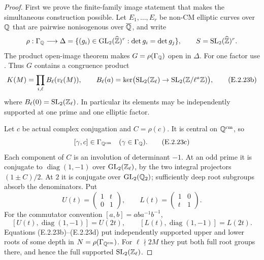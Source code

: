 \begin{proof}
First we prove the finite-family image statement that makes
the simultaneous construction possible. Let
\(E_1,\ldots,E_r\) be non-CM elliptic curves over \(\mathbb Q\)
that are pairwise nonisogenous over \(\overline{\mathbb Q}\), and write
\[
 \rho:\Gamma_{\mathbb Q}\longrightarrow
 \Delta=\{(g_i)\in\operatorname{GL}_2(\widehat{\mathbb Z})^r:
                  \det g_i=\det g_j\},\qquad
 S=\operatorname{SL}_2(\widehat{\mathbb Z})^r.
\]
The product open-image theorem
\cite[Theorem 1.1 and Remark 1.2, author PDF p.1]{GenLombardo}
makes \(G=\rho(\Gamma_{\mathbb Q})\) open in \(\Delta\).
For one factor use \cite[Theorem 3, p.299]{GenSerre1972}.
Thus \(G\) contains a congruence product
\[
 K(M)=\prod_{i,\ell}B_\ell(v_\ell(M)),\qquad
 B_\ell(a)=\ker\bigl(\operatorname{SL}_2(\mathbb Z_\ell)
                 \to\operatorname{SL}_2(\mathbb Z/\ell^a\mathbb Z)\bigr),
 \tag{E.2.23b}
\]
where \(B_\ell(0)=\operatorname{SL}_2(\mathbb Z_\ell)\).
In particular its elements may be independently supported
at one prime and one elliptic factor.

Let \(c\) be actual complex conjugation and \(C=\rho(c)\).
It is central on \(\mathbb Q^{\mathrm{cm}}\), so
\[
 [\gamma,c]\in\Gamma_{\mathbb Q^{\mathrm{cm}}}
       \quad(\gamma\in\Gamma_\mathbb Q).
 \tag{E.2.23c}
\]
Each component of \(C\) is an involution of determinant
\(-1\). At an odd prime it is conjugate to
\(\operatorname{diag}(1,-1)\) over \(\operatorname{GL}_2(\mathbb Z_\ell)\),
by the two integral projectors \((1\pm C)/2\).
At \(2\) it is conjugate over \(\operatorname{GL}_2(\mathbb Q_2)\);
sufficiently deep root subgroups absorb the denominators.
Put
\[
 U(t)=\begin{pmatrix}1&t\\0&1\end{pmatrix},\qquad
 L(t)=\begin{pmatrix}1&0\\t&1\end{pmatrix}.
\]
For the commutator convention \([a,b]=aba^{-1}b^{-1}\),
\[
 [U(t),\operatorname{diag}(1,-1)]=U(2t),\qquad
 [L(t),\operatorname{diag}(1,-1)]=L(2t).
 \tag{E.2.23d}
\]
Equations (E.2.23b)--(E.2.23d) put independently supported
upper and lower roots of some depth in
\(N=\rho(\Gamma_{\mathbb Q^{\mathrm{cm}}})\).
For \(\ell\nmid2M\) they put both full root groups there,
and hence the full supported \(\operatorname{SL}_2(\mathbb Z_\ell)\).


\end{proof}
